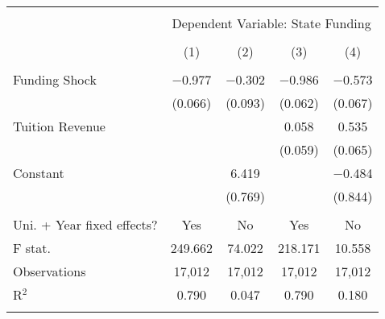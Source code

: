 
\begin{tabular}{@{\extracolsep{5pt}}lcccc} 
\\[-1.8ex]\hline 
\hline \\[-1.8ex] 
 & \multicolumn{4}{c}{Dependent Variable: State Funding} \\ 
\cline{2-5} 
\\[-1.8ex] & (1) & (2) & (3) & (4)\\ 
\hline \\[-1.8ex] 
 Funding Shock & $-$0.977 & $-$0.302 & $-$0.986 & $-$0.573 \\ 
  & (0.066) & (0.093) & (0.062) & (0.067) \\ 
  Tuition Revenue &  &  & 0.058 & 0.535 \\ 
  &  &  & (0.059) & (0.065) \\ 
  Constant &  & 6.419 &  & $-$0.484 \\ 
  &  & (0.769) &  & (0.844) \\ 
 \hline \\[-1.8ex] 
Uni. + Year fixed effects? & Yes & No & Yes & No \\ 
F stat. & 249.662 & 74.022 & 218.171 & 10.558 \\ 
Observations & 17,012 & 17,012 & 17,012 & 17,012 \\ 
R$^{2}$ & 0.790 & 0.047 & 0.790 & 0.180 \\ 
\hline 
\hline \\[-1.8ex] 
\end{tabular} 

